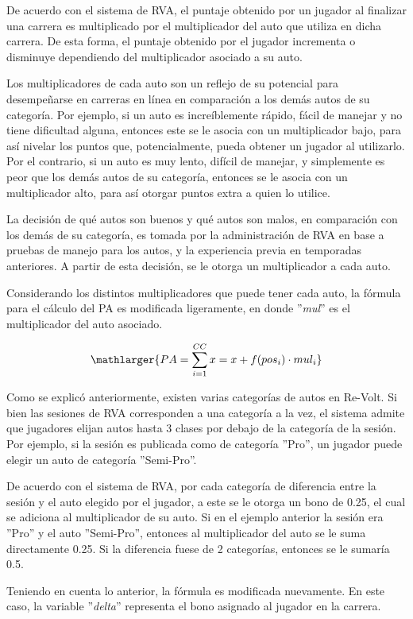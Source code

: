 De acuerdo con el sistema de RVA, el puntaje obtenido por un jugador al finalizar una carrera es multiplicado por el multiplicador del auto que utiliza en dicha carrera. De esta forma, el puntaje obtenido por el jugador incrementa o disminuye dependiendo del multiplicador asociado a su auto.

Los multiplicadores de cada auto son un reflejo de su potencial para desempeñarse en carreras en línea en comparación a los demás autos de su categoría. Por ejemplo, si un auto es increíblemente rápido, fácil de manejar y no tiene dificultad alguna, entonces este se le asocia con un multiplicador bajo, para así nivelar los puntos que, potencialmente, pueda obtener un jugador al utilizarlo. Por el contrario, si un auto es muy lento, difícil de manejar, y simplemente es peor que los demás autos de su categoría, entonces se le asocia con un multiplicador alto, para así otorgar puntos extra a quien lo utilice.

La decisión de qué autos son buenos y qué autos son malos, en comparación con los demás de su categoría, es tomada por la administración de RVA en base a pruebas de manejo para los autos, y la experiencia previa en temporadas anteriores. A partir de esta decisión, se le otorga un multiplicador a cada auto.

Considerando los distintos multiplicadores que puede tener cada auto, la fórmula para el cálculo del PA es modificada ligeramente, en donde ''\textit{mul}'' es el multiplicador del auto asociado.

\[
\mathlarger{{PA} = \sum_{i=1}^{CC}x=x+f(pos_i) \cdot mul_i}
\]

Como se explicó anteriormente, existen varias categorías de autos en Re-Volt. Si bien las sesiones de RVA corresponden a una categoría a la vez, el sistema admite que jugadores elijan autos hasta 3 clases por debajo de la categoría de la sesión. Por ejemplo, si la sesión es publicada como de categoría ''Pro'', un jugador puede elegir un auto de categoría ''Semi-Pro''.

De acuerdo con el sistema de RVA, por cada categoría de diferencia entre la sesión y el auto elegido por el jugador, a este se le otorga un bono de 0.25, el cual se adiciona al multiplicador de su auto. Si en el ejemplo anterior la sesión era ''Pro'' y el auto ''Semi-Pro'', entonces al multiplicador del auto se le suma directamente 0.25. Si la diferencia fuese de 2 categorías, entonces se le sumaría 0.5.

Teniendo en cuenta lo anterior, la fórmula es modificada nuevamente. En este caso, la variable ''\textit{delta}'' representa el bono asignado al jugador en la carrera.

